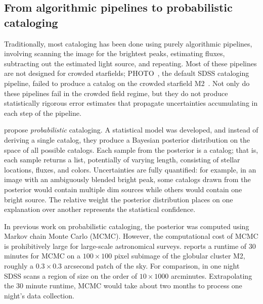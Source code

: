 \subsection{From algorithmic pipelines to probabilistic cataloging}

Traditionally, most cataloging has been done using purely algorithmic pipelines, involving scanning the image for the brightest peaks, estimating fluxes, subtracting out the estimated light source, and repeating. Most of these pipelines are not designed for crowded starfields; PHOTO~\cite{lupton2001sdss}, 
the default SDSS cataloging pipeline, failed to 
produce a catalog on 
the crowded starfield M2~\cite{Portillo_2017}. 
Not only do these pipelines fail in the crowded field
regime, but they do not produce statistically rigorous error estimates that propagate 
uncertainties accumulating in each step of the pipeline. 

\cite{Brewer_2013, Portillo_2017, Feder_2019}
propose {\itshape probabilistic} cataloging.
A statistical model was developed, and instead of deriving a single catalog, they produce a Bayesian posterior distribution on the space of all possible catalogs. 
Each sample from the posterior is a catalog; that is, each sample returns a list, potentially of varying length, consisting of stellar locations, fluxes, and colors. Uncertainties are fully quantified: for example, in an image with an ambiguously blended bright peak, some catalogs drawn from the posterior would contain multiple dim sources while others would contain one bright source. The relative weight the posterior distribution places on one explanation over another represents the statistical confidence. 

In previous work on probabilistic cataloging, the posterior was computed using
Markov chain Monte Carlo (MCMC).
However, the computational cost of MCMC is prohibitively large for
large-scale astronomical surveys. \cite{Feder_2019}
reports a runtime of 30 minutes for MCMC on a $100\times 100$ pixel subimage of the globular cluster M2, roughly a $0.3\times0.3$ arcsecond patch of the sky.
For comparison, in one night SDSS scans a region of size on the order of $10 \times 1000$ arcminutes. Extrapolating the 30 minute runtime, MCMC would take about two months to process one night's data collection.

